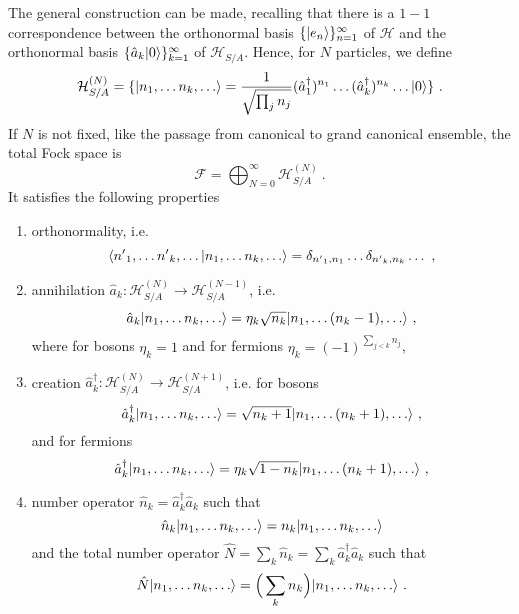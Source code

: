     The general construction can be made, recalling that there is a $1-1$ correspondence between the orthonormal basis $\{\vert e_n\rangle\}_{n=1}^\infty$ of $\mathcal H$ and the orthonormal basis $\{\hat a_k \vert0\rangle\}_{k=1}^\infty$ of $\mathcal H_{S/A}$. Hence, for $N$ particles, we define
    \begin{equation*}
        \mathcal H_{S/A}^{(N)} = \{\vert n_1, \ldots n_k, \ldots\rangle = \frac{1}{\sqrt{ \prod_j n_j}} (\hat a_1^\dagger)^{n_1} \ldots (\hat a_k^\dagger)^{n_k} \ldots \vert0\rangle \} ~.
    \end{equation*} 
    If $N$ is not fixed, like the passage from canonical to grand canonical ensemble, the total Fock space is 
    \begin{equation*}
        \mathcal F = \bigoplus_{N=0}^\infty \mathcal H^{(N)}_{S/A} ~.
    \end{equation*} 
    It satisfies the following properties 
    \begin{enumerate}
        \item orthonormality, i.e. 
            \begin{equation*}
                \langle{n'}_1, \ldots {n'}_k, \ldots\vert n_1, \ldots n_k, \ldots\rangle = \delta_{{n'}_1, n_1} \ldots \delta_{{n'}_k, n_k} \ldots  ~,
            \end{equation*}
        \item annihilation $\hat a_k \colon \mathcal H^{(N)}_{S/A} \rightarrow \mathcal H^{(N-1)}_{S/A}$, i.e.
            \begin{equation*}
                \hat a_k \vert n_1, \ldots n_k, \ldots\rangle = \eta_k \sqrt{n_k} \vert n_1, \ldots (n_k - 1), \ldots\rangle ~,
            \end{equation*}
            where for bosons $\eta_k = 1$ and for fermions $\eta_k = (-1)^{\sum_{j < k} n_j}$,
        \item creation $\hat a_k^\dagger \colon \mathcal H^{(N)}_{S/A} \rightarrow \mathcal H^{(N+1)}_{S/A}$, i.e. for bosons
            \begin{equation*}
                \hat a^\dagger_k \vert n_1, \ldots n_k, \ldots\rangle = \sqrt{n_k + 1} \vert n_1, \ldots (n_k + 1), \ldots\rangle ~,
            \end{equation*}
            and for fermions
            \begin{equation*}
                \hat a^\dagger_k \vert n_1, \ldots n_k, \ldots\rangle = \eta_k \sqrt{1 - n_k} \vert n_1, \ldots (n_k + 1), \ldots\rangle ~,
            \end{equation*}
        \item number operator $\hat n_k = \hat a_k^\dagger \hat a_k$ such that 
            \begin{equation*}
                \hat n_k \vert n_1, \ldots n_k, \ldots\rangle = n_k \vert n_1, \ldots n_k, \ldots\rangle
            \end{equation*}
        and the total number operator $\hat N = \sum_k \hat n_k = \sum_k \hat a^\dagger_k \hat a_k$ such that 
        \begin{equation*}
            \hat N \vert n_1, \ldots n_k, \ldots\rangle = \Big (\sum_k n_k \Big ) \vert n_1, \ldots n_k, \ldots\rangle ~.
        \end{equation*}
    \end{enumerate}

